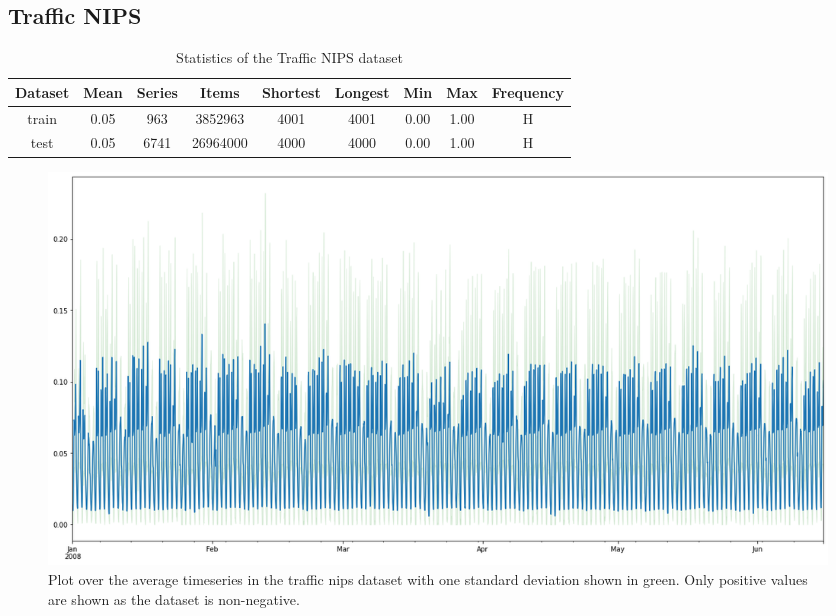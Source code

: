 \clearpage
\subsection{Traffic NIPS}
\begin{table}[htb]
    \begin{tabular}{||c | c c c c c c c c ||} 
        \hline
       Dataset & Mean & Series & Items & Shortest & Longest & Min & Max & Frequency\\ [0.5ex] 
        \hline\hline
        train & 0.05 & 963 & 3852963 & 4001 & 4001 & 0.00 & 1.00 & H\\ 
        \hline
        test & 0.05 & 6741 & 26964000 & 4000 & 4000 & 0.00 & 1.00 & H\\
        \hline
    \end{tabular}
   \caption{Statistics of the Traffic NIPS dataset}
\end{table}


\begin{figure}[htb]
    \centering
      \includegraphics[width=\linewidth]{4_designing/figures/traffic_nips_plot.png}
      \caption{Plot over the average timeseries in the traffic nips dataset with one standard deviation shown in green. Only positive values are shown as the dataset is non-negative.}
      \label{fig:traffic_nips_plot}
    \endminipage\hfill
\end{figure}

